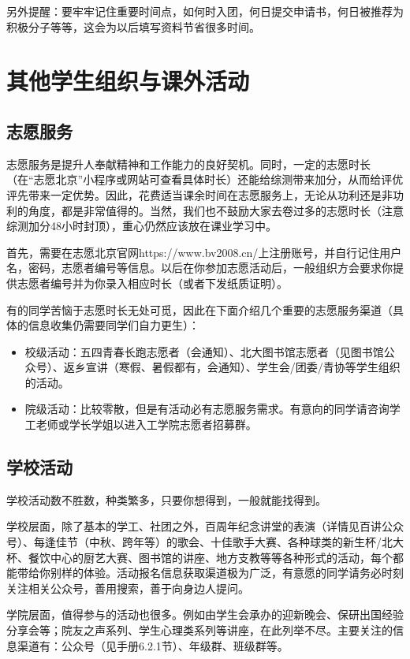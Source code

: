 \documentclass[11pt,oneside]{book}
\begin{document}
另外提醒：要牢牢记住重要时间点，如何时入团，何日提交申请书，何日被推荐为积极分子等等，这会为以后填写资料节省很多时间。

\section{其他学生组织与课外活动}
\subsection{志愿服务}
志愿服务是提升人奉献精神和工作能力的良好契机。同时，一定的志愿时长（在“志愿北京”小程序或网站可查看具体时长）还能给综测带来加分，从而给评优评先带来一定优势。因此，花费适当课余时间在志愿服务上，无论从功利还是非功利的角度，都是非常值得的。当然，我们也不鼓励大家去卷过多的志愿时长（注意综测加分48小时封顶），重心仍然应该放在课业学习中。

首先，需要在志愿北京官网https://www.bv2008.cn/上注册账号，并自行记住用户名，密码，志愿者编号等信息。以后在你参加志愿活动后，一般组织方会要求你提供志愿者编号并为你录入相应时长（或者下发纸质证明）。

有的同学苦恼于志愿时长无处可觅，因此在下面介绍几个重要的志愿服务渠道（具体的信息收集仍需要同学们自力更生）：
\begin{itemize}
	\item 校级活动：五四青春长跑志愿者（会通知）、北大图书馆志愿者（见图书馆公众号）、返乡宣讲（寒假、暑假都有，会通知）、学生会/团委/青协等学生组织的活动。
	\item 院级活动：比较零散，但是有活动必有志愿服务需求。有意向的同学请咨询学工老师或学长学姐以进入工学院志愿者招募群。
\end{itemize}




\subsection{学校活动}
学校活动数不胜数，种类繁多，只要你想得到，一般就能找得到。

学校层面，除了基本的学工、社团之外，百周年纪念讲堂的表演（详情见百讲公众号）、每逢佳节（中秋、跨年等）的歌会、十佳歌手大赛、各种球类的新生杯/北大杯、餐饮中心的厨艺大赛、图书馆的讲座、地方支教等等各种形式的活动，每个都能带给你别样的体验。活动报名信息获取渠道极为广泛，有意愿的同学请务必时刻关注相关公众号，善用搜索，善于向身边人提问。

学院层面，值得参与的活动也很多。例如由学生会承办的迎新晚会、保研出国经验分享会等；院友之声系列、学生心理类系列等讲座，在此列举不尽。主要关注的信息渠道有：公众号（见手册6.2.1节）、年级群、班级群等。
\end{document}
